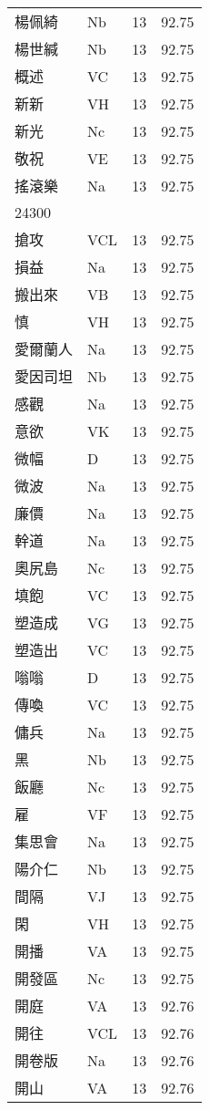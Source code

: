 \documentclass[twocolumn]{book}
\begin{document}
\begin{supertabular}{llrr}
楊佩綺 & Nb & 13 &  92.75\\
楊世緘 & Nb & 13 &  92.75\\
概述 & VC & 13 &  92.75\\
新新 & VH & 13 &  92.75\\
新光 & Nc & 13 &  92.75\\
敬祝 & VE & 13 &  92.75\\
搖滾樂 & Na & 13 &  92.75\\
24300\\
搶攻 & VCL & 13 &  92.75\\
損益 & Na & 13 &  92.75\\
搬出來 & VB & 13 &  92.75\\
慎 & VH & 13 &  92.75\\
愛爾蘭人 & Na & 13 &  92.75\\
愛因司坦 & Nb & 13 &  92.75\\
感觀 & Na & 13 &  92.75\\
意欲 & VK & 13 &  92.75\\
微幅 & D & 13 &  92.75\\
微波 & Na & 13 &  92.75\\
廉價 & Na & 13 &  92.75\\
幹道 & Na & 13 &  92.75\\
奧尻島 & Nc & 13 &  92.75\\
填飽 & VC & 13 &  92.75\\
塑造成 & VG & 13 &  92.75\\
塑造出 & VC & 13 &  92.75\\
嗡嗡 & D & 13 &  92.75\\
傳喚 & VC & 13 &  92.75\\
傭兵 & Na & 13 &  92.75\\
黑 & Nb & 13 &  92.75\\
飯廳 & Nc & 13 &  92.75\\
雇 & VF & 13 &  92.75\\
集思會 & Na & 13 &  92.75\\
陽介仁 & Nb & 13 &  92.75\\
間隔 & VJ & 13 &  92.75\\
閑 & VH & 13 &  92.75\\
開播 & VA & 13 &  92.75\\
開發區 & Nc & 13 &  92.75\\
開庭 & VA & 13 &  92.76\\
開往 & VCL & 13 &  92.76\\
開卷版 & Na & 13 &  92.76\\
開山 & VA & 13 &  92.76\\

\end{supertabular}
\end{document}
